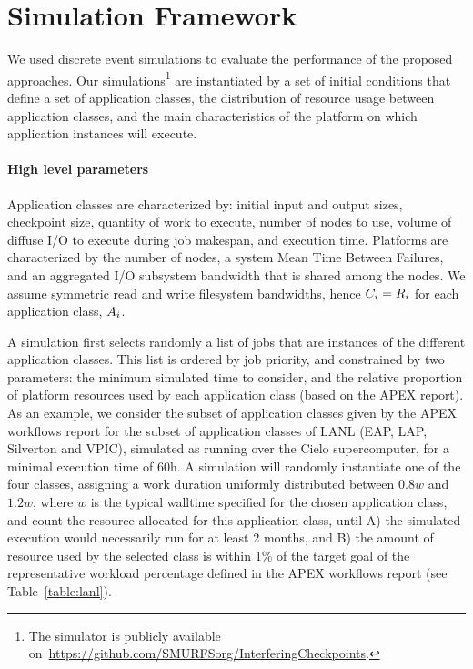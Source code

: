 
\section{Simulation Framework}
\label{sec:simulator}

We used discrete event simulations to evaluate the performance of the proposed
approaches.  Our simulations\footnote{The simulator is publicly
  available on~\url{https://github.com/SMURFSorg/InterferingCheckpoints}.} are
instantiated by a set of initial conditions that define a set of application classes,
the distribution of resource usage between application classes, and the main
characteristics of the platform on which application instances will execute.

\paragraph*{High level parameters}
Application classes are characterized by: initial input and output sizes, checkpoint
size, quantity of work to execute, number of nodes to use, volume of diffuse I/O to
execute during job makespan, and execution time. 
  Platforms are characterized by the number of nodes, a system Mean Time
Between Failures, and an aggregated I/O subsystem bandwidth that is shared among the
nodes. We assume symmetric read and write filesystem bandwidths, hence
$C_{i}=R_{i}$ for each application class, $A_{i}$.

A simulation first selects randomly a list of jobs that are instances of the
different application classes. This list is ordered by job priority, and constrained
by two parameters: the minimum simulated time to consider, and the relative
proportion of platform resources used by each application class (based on the APEX
report).   As an example,
we consider the subset of application classes given by the APEX workflows report for
the subset of application classes of LANL (EAP, LAP, Silverton and VPIC), simulated
as running over the Cielo supercomputer, for a minimal execution time of 60h. A
simulation will randomly instantiate one of the four classes, assigning a work
duration uniformly distributed between $0.8w$ and $1.2w$, where $w$ is the typical
walltime specified for the chosen application class, and count the resource allocated
for this application class, until A) the simulated execution would necessarily run
for at least 2 months, and B) the amount of resource used by the selected class is
within 1\% of the target goal of the representative workload percentage defined in
the APEX workflows report (see Table~\ref{table:lanl}).

